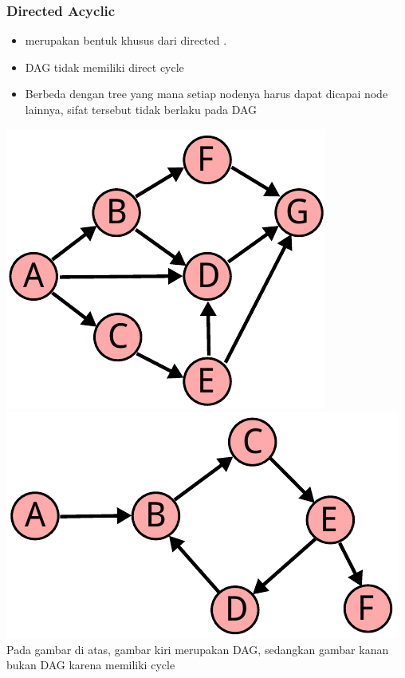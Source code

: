 \begin{frame}
\frametitle{Directed Acyclic \fGraph}
\begin{itemize}
  \item {} merupakan bentuk khusus dari directed \fgraph.
  \item DAG tidak memiliki \alert{direct cycle}
  \item Berbeda dengan tree yang mana setiap nodenya harus dapat dicapai node lainnya, sifat tersebut tidak berlaku pada DAG
\end{itemize}

\includegraphics[width=4 cm]{asset/dag.pdf}
\hspace{\fill}
\includegraphics[width=5 cm]{asset/not-dag.pdf}
\newline\newline
Pada gambar di atas, gambar kiri merupakan DAG, sedangkan gambar kanan bukan DAG karena memiliki cycle
\end{frame}


